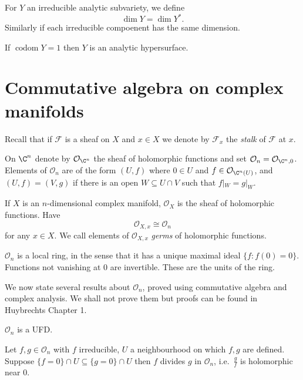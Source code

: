 \documentclass[a4paper]{article}
\begin{document}
\begin{definition}
  For \(Y\) an irreducible analytic subvariety, we define
  \[
    \dim Y = \dim Y^*.
  \]
  Similarly if each irreducible compoenent has the same dimension.

\end{definition}

If \(\operatorname{codom} Y = 1\) then \(Y\) is an analytic hypersurface.

\section{Commutative algebra on complex manifolds}

Recall that if \(\mathcal F\) is a sheaf on \(X\) and \(x \in X\) we denote by \(\mathcal F_x\) the \emph{stalk} of \(\mathcal F\) at \(x\).

On \(\C^n\) denote by \(\mathcal O_{\C^n}\) the sheaf of holomorphic functions and set \(\mathcal O_n = \mathcal O_{\C^n, 0}\). Elements of \(\mathcal O_n\) are of the form \((U, f)\) where \(0 \in U\) and \(f \in \mathcal O_{\C^n(U)}\), and \((U, f) = (V, g)\) if there is an open \(W \subseteq U \cap V\) such that \(f|_W = g|_W\).

If \(X\) is an \(n\)-dimensional complex manifold, \(\mathcal O_X\) is the sheaf of holomorphic functions. Have
\[
  \mathcal O_{X, x} \cong \mathcal O_n
\]
for any \(x \in X\). We call elements of \(\mathcal O_{X, x}\) \emph{germs} of holomorphic functions.

\(\mathcal O_n\) is a local ring, in the sense that it has a unique maximal ideal \(\{f: f(0) = 0\}\). Functions not vanishing at \(0\) are invertible. These are the units of the ring.

We now state several results about \(\mathcal O_n\), proved using commutative algebra and complex analysis. We shall not prove them but proofs can be found in Huybrechts Chapter 1.

\begin{theorem}
  \(\mathcal O_n\) is a UFD.
\end{theorem}

\begin{theorem}
  Let \(f, g \in \mathcal O_n\) with \(f\) irreducible, \(U\) a neighbourhood on which \(f, g\) are defined. Suppose \(\{f = 0\} \cap U \subseteq \{g = 0\} \cap U\) then \(f\) divides \(g\) in \(\mathcal O_n\), i.e.\ \(\frac{g}{f}\) is holomorphic near \(0\).
\end{theorem}
\end{document}
